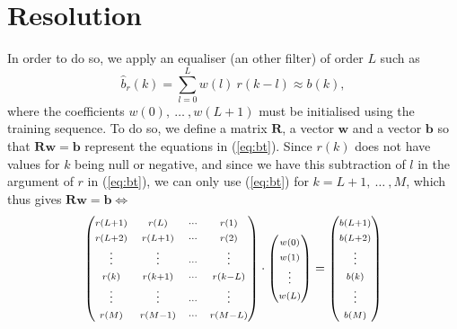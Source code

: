 \documentclass[twocolumn, 12pt]{IEEEtran}
\begin{document}
 \section{Resolution}
 
 In order to do so, we apply an equaliser (an other filter) of order $L$ such as 
 \begin{equation}\label{eq:bt}
 { \hat{b}_{r}(k) = \sum\limits_{l=0}^{L}w(l)~r(k-l) \approx b(k) },
 \end{equation}
 where the coefficients ${w(0)},~{\dots~},{w(L+1)}$ must be initialised using the training sequence. To do so, we define a matrix $\bm{R}$, a vector $\bm{w}$ and a vector $\bm{b}$ so that $\bm{Rw}=\bm{b}$ represent the equations in (\ref{eq:bt}). Since $r(k)$ does not have values for $k$ being null or negative, and since we have this subtraction of $l$ in the argument of $r$ in (\ref{eq:bt}), we can only use (\ref{eq:bt}) for $k = L+1,~\dots~, M$, which thus gives $\bm{Rw}=\bm{b} \Leftrightarrow $
\begin{equation}\label{eq:matrixes}
\begin{pmatrix}
    \mathsmaller{r(L+1)}   & \mathsmaller{r(L)} & \mathsmaller{\cdots}  & \mathsmaller{r(1)} \\
    \mathsmaller{r(L+2)}   & \mathsmaller{r(L+1)} & \mathsmaller{\cdots}  & \mathsmaller{r(2)} \\
    \mathsmaller{\vdots}   & \mathsmaller{\vdots} & \mathsmaller{\cdots} & \mathsmaller{\vdots} \\
    \mathsmaller{r(k)}     & \mathsmaller{r(k+1)} & \mathsmaller{\cdots} & \mathsmaller{r(k-L)} \\
    \mathsmaller{\vdots}   & \mathsmaller{\vdots} & \mathsmaller{\cdots} & \mathsmaller{\vdots} \\
    \mathsmaller{r(M)} & \mathsmaller{r(M-1)} & \mathsmaller{\cdots}  & \mathsmaller{r(M-L)}
\end{pmatrix}
\cdot
\begin{pmatrix}
   \mathsmaller{w(0)}\\
   \mathsmaller{w(1)}\\
   \mathsmaller{\vdots}\\
   \mathsmaller{w(L)}
\end{pmatrix}
=
\begin{pmatrix}
   \mathsmaller{b(L+1)}\\
   \mathsmaller{b(L+2)}\\
   \mathsmaller{\vdots}\\
   \mathsmaller{b(k)}\\
   \mathsmaller{\vdots}\\
   \mathsmaller{b(M)}
\end{pmatrix}
\end{equation}
\end{document}

